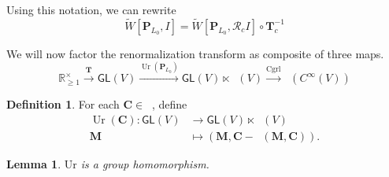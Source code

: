 \documentclass[12pt]{article}
\newcounter{counter}
\theoremstyle{definition}
\newtheorem{dfn}[counter]{Definition}
\theoremstyle{plain}
\newtheorem{lem}[counter]{Lemma}
\newcommand{\Symp}{\mathop{\mathrm{Sym}_2^+}}
\newcommand{\ActSym}
{\mathop{\mathrm{Act}_{\mathrm{Sym}}}}
\begin{document}
Using this notation, we can rewrite 
\begin{equation}
    \tilde{W}[\mathbf{P}_{L_0}, I] = \tilde{W}[\mathbf{P}_{L_0}, \mathcal{R}_c I] \circ \mathbf{T}^{-1}_c
\end{equation}

We will now factor the renormalization transform as composite of three maps.
\begin{equation}
    \mathbb{R}^\times_{\ge 1} \xrightarrow{\mathbf{T}} \mathsf{GL}(V) \xrightarrow{\mathop{\mathrm{Ur}} (\mathbf{P}_{L_0})} \mathsf{GL}(V) \ltimes \Symp (V) \xrightarrow{\mathop{\mathrm{Cgrl}}} \mathop{\mathrm{End}_{\mathrm{Set}}} (C^\infty (V))
\end{equation}

\begin{dfn}
    For each \(\mathbf{C} \in \Symp\), define
    \begin{align}
        \mathop{\mathrm{Ur}} (\mathbf{C}) \colon \mathsf{GL}(V) &\to \mathsf{GL} (V) \ltimes \Symp (V) \\
        \mathbf{M} & \mapsto (\mathbf{M}, \mathbf{C} - \ActSym (\mathbf{M}, \mathbf{C})).
    \end{align}
\end{dfn}

\pagebreak

\begin{lem}
    \(\mathrm{Ur}\) is a group homomorphism.
\end{lem}
\end{document}
